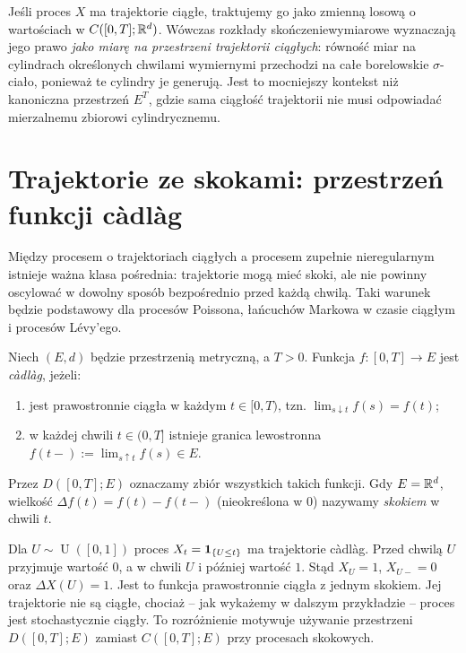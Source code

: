 \begin{uwaga}
Jeśli proces $X$ ma trajektorie ciągłe, traktujemy go jako
zmienną losową o wartościach w $C([0,T];\mathbb{R}^d)$. Wówczas
rozkłady skończeniewymiarowe wyznaczają jego prawo
\emph{jako miarę na przestrzeni trajektorii ciągłych}:
równość miar na cylindrach określonych chwilami wymiernymi
przechodzi na całe borelowskie $\sigma$-ciało, ponieważ
te cylindry je generują. Jest to mocniejszy kontekst niż
kanoniczna przestrzeń $E^T$, gdzie sama ciągłość trajektorii
nie musi odpowiadać mierzalnemu zbiorowi cylindrycznemu.
\end{uwaga}

\section{Trajektorie ze skokami: przestrzeń funkcji c\`adl\`ag}
Między procesem o trajektoriach ciągłych a procesem
zupełnie nieregularnym istnieje ważna klasa pośrednia:
trajektorie mogą mieć skoki, ale nie powinny oscylować
w dowolny sposób bezpośrednio przed każdą chwilą.
Taki warunek będzie podstawowy dla procesów Poissona,
łańcuchów Markowa w czasie ciągłym i procesów Lévy'ego.

\begin{definicja}
Niech $(E,d)$ będzie przestrzenią metryczną, a $T>0$.
Funkcja $f:[0,T]\to E$ jest \emph{c\`adl\`ag}, jeżeli:
\begin{enumerate}
\item jest prawostronnie ciągła w każdym $t\in[0,T)$,
tzn. $\lim_{s\downarrow t}f(s)=f(t)$;
\item w każdej chwili $t\in(0,T]$ istnieje
granica lewostronna
$f(t-):=\lim_{s\uparrow t}f(s)\in E$.
\end{enumerate}
Przez $D([0,T];E)$ oznaczamy zbiór wszystkich takich funkcji.
Gdy $E=\mathbb{R}^d$, wielkość $\Delta f(t)=f(t)-f(t-)$
(nieokreślona w $0$) nazywamy \emph{skokiem} w chwili $t$.
\end{definicja}

\begin{przyklad}
Dla $U\sim\operatorname{U}([0,1])$ proces
$X_t=\mathbf{1}_{\{U\le t\}}$ ma trajektorie c\`adl\`ag.
Przed chwilą $U$ przyjmuje wartość $0$,
a w chwili $U$ i później wartość $1$.
Stąd $X_U=1$, $X_{U-}=0$ oraz $\Delta X(U)=1$.
Jest to funkcja prawostronnie ciągła z jednym skokiem.
Jej trajektorie nie są ciągłe, chociaż -- jak wykażemy
w dalszym przykładzie -- proces jest stochastycznie ciągły.
To rozróżnienie motywuje używanie przestrzeni $D([0,T];E)$
zamiast $C([0,T];E)$ przy procesach skokowych.
\end{przyklad}

